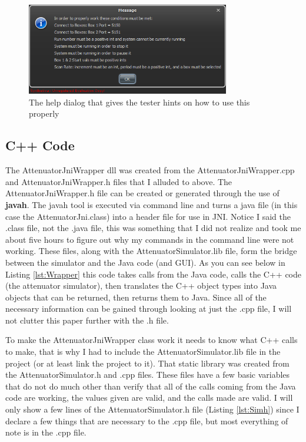 \documentclass [a4paper,12pt,oneside,final,titlepage]{article}
\begin{document}
	\begin{figure}[htp]
		\centering
		\includegraphics[height=40mm]{help}
		\caption{The help dialog that gives the tester hints on how to use this properly}
		\label{fig:help}
	\end{figure}	
	

	

\subsection{C++ Code}
	The AttenuatorJniWrapper dll was created from the AttenuatorJniWrapper.cpp and AttenuatorJniWrapper.h files that I alluded to above. The AttenuatorJniWrapper.h file can be created or generated through the use of \textbf{javah}. The javah tool is executed via command line and turns a java file (in this case the AttenuatorJni.class) into a header file for use in JNI. Notice I said the .class file, not the .java file, this was something that I did not realize and took me about five hours to figure out why my commands in the command line were not working. These files, along with the AttenuatorSimulator.lib file, form the bridge between the simulator and the Java code (and GUI). As you can see below in Listing \ref{lst:Wrapper} this code takes calls from the Java code, calls the C++ code (the attenuator simulator), then translates the C++ object types into Java objects that can be returned, then returns them to Java. Since all of the necessary information can be gained through looking at just the .cpp file, I will not clutter this paper further with the .h file.

	

	To make the AttenuatorJniWrapper class work it needs to know what C++ calls to make, that is why I had to include the AttenuatorSimulator.lib file in the project (or at least link the project to it). That static library was created from the AttenuatorSimulator.h and .cpp files. These files have a few basic variables that do not do much other than verify that all of the calls coming from the Java code are working, the values given are valid, and the calls made are valid. I will only show a few lines of the AttenuatorSimulator.h file (Listing \ref{lst:Simh}) since I declare a few things that are necessary to the .cpp file, but most everything of note is in the .cpp file. 
\end{document}
